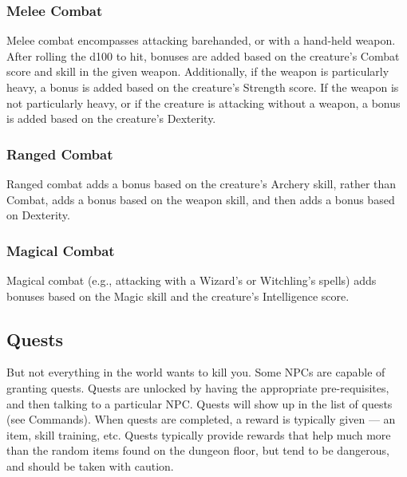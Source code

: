 \subsubsection{Melee Combat}

Melee combat encompasses attacking barehanded, or with a hand-held
weapon.  After rolling the d100 to hit, bonuses are added based on the
creature's Combat score and skill in the given weapon.  Additionally, if
the weapon is particularly heavy, a bonus is added based on the creature's
Strength score.  If the weapon is not particularly heavy, or if the
creature is attacking without a weapon, a bonus is added based on the 
creature's Dexterity.

\subsubsection{Ranged Combat}

Ranged combat adds a bonus based on the creature's Archery skill, rather
than Combat, adds a bonus based on the weapon skill, and then adds a 
bonus based on Dexterity.

\subsubsection{Magical Combat}

Magical combat (e.g., attacking with a Wizard's or Witchling's spells)
adds bonuses based on the Magic skill and the creature's Intelligence
score.

\subsection{Quests}

But not everything in the world wants to kill you.  Some NPCs are capable 
of granting quests.  Quests are unlocked by having the appropriate 
pre-requisites, and then talking to a particular NPC.  Quests will show up 
in the list of quests (see Commands).  When quests are completed, a reward 
is typically given --- an item, skill training, etc.  Quests typically 
provide rewards that help much more than the random items found on the 
dungeon floor, but tend to be dangerous, and should be taken with caution.
